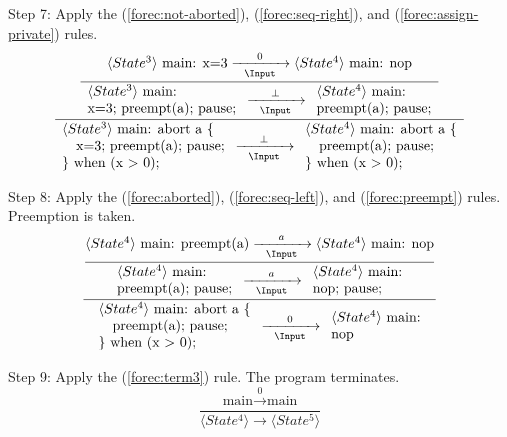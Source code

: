 \noindent
Step 7: Apply the (\ref{forec:not-aborted}), (\ref{forec:seq-right}), 
and (\ref{forec:assign-private}) rules. 
\begin{equation*}
	\frac{
		\dfrac{
				\langle State^3 \rangle ~ \text{main: x=3}
					\xrightarrow[~~\Input~~]{0}
				 \langle State^4 \rangle ~ \text{main: nop}
			}{
				\begin{array}{l}
					\langle State^3 \rangle ~ \text{main:}	\\
					\text{x=3; preempt(a); pause;}							
				\end{array}
					\xrightarrow[~~\Input~~]{\bot} 
				\begin{array}{l}
					\langle State^4 \rangle ~ \text{main:}	\\
					\text{preempt(a); pause;}							
				\end{array}
			}
		}{
			\begin{array}{l}
				\langle State^3 \rangle ~ \text{main: abort a \{}	\\
				\text{~~~x=3; preempt(a); pause;}					\\
				\text{\} when (x > 0);}
			\end{array}
				\xrightarrow[~~\Input~~]{\bot} 
			\begin{array}{l}
				\langle State^4 \rangle ~ \text{main: abort a \{}	\\
				\text{~~~preempt(a); pause;}						\\
				\text{\} when (x > 0);}
			\end{array}
		}
\end{equation*}

\noindent
Step 8: Apply the (\ref{forec:aborted}), (\ref{forec:seq-left}), 
and (\ref{forec:preempt}) rules. Preemption is taken.
\begin{equation*}
	\frac{
		\dfrac{
				\langle State^4 \rangle ~ \text{main: preempt(a)}
					\xrightarrow[~~\Input~~]{a}
				 \langle State^4 \rangle ~ \text{main: nop}
			}{
				\begin{array}{l}
					\langle State^4 \rangle ~ \text{main:}	\\
					\text{preempt(a); pause;}							
				\end{array}
					\xrightarrow[~~\Input~~]{a} 
				\begin{array}{l}
					\langle State^4 \rangle ~ \text{main:}	\\
					\text{nop; pause;}							
				\end{array}
			}
		}{
			\begin{array}{l}
				\langle State^4 \rangle ~ \text{main: abort a \{}	\\
				\text{~~~preempt(a); pause;}						\\
				\text{\} when (x > 0);}
			\end{array}
				\xrightarrow[~~\Input~~]{0} 
			\begin{array}{l}
				\langle State^4 \rangle ~ \text{main:}	\\
				\text{nop}
			\end{array}
		}
\end{equation*}

\noindent
Step 9: Apply the (\ref{forec:term3}) rule.
The program terminates.
\begin{equation*}
	\frac{
			\text{main} \xrightarrow{~~0~~} \text{main}
		}{
			\langle State^4 \rangle \xrightarrow{~~~~~} \langle State^5 \rangle
		}
\end{equation*}
